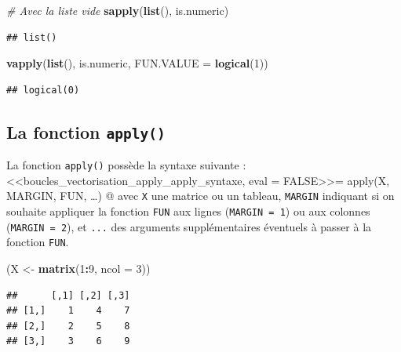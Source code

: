 \documentclass[
  11pt,
]{book}
\newenvironment{Shaded}{\begin{snugshade}}{\end{snugshade}}
\newcommand{\CommentTok}[1]{\textcolor[rgb]{0.56,0.35,0.01}{\textit{#1}}}
\newcommand{\DataTypeTok}[1]{\textcolor[rgb]{0.13,0.29,0.53}{#1}}
\newcommand{\DecValTok}[1]{\textcolor[rgb]{0.00,0.00,0.81}{#1}}
\newcommand{\KeywordTok}[1]{\textcolor[rgb]{0.13,0.29,0.53}{\textbf{#1}}}
\newcommand{\NormalTok}[1]{#1}
\newcommand{\OperatorTok}[1]{\textcolor[rgb]{0.81,0.36,0.00}{\textbf{#1}}}
\newcommand{\StringTok}[1]{\textcolor[rgb]{0.31,0.60,0.02}{#1}}
\numberwithin{equation}{section}
\numberwithin{countremarque}{section}
\begin{document}
\begin{Shaded}
\begin{Highlighting}[]
\CommentTok{\# Avec la liste vide}
\KeywordTok{sapply}\NormalTok{(}\KeywordTok{list}\NormalTok{(), is.numeric)}
\end{Highlighting}
\end{Shaded}

\begin{lstlisting}
## list()
\end{lstlisting}

\begin{Shaded}
\begin{Highlighting}[]
\KeywordTok{vapply}\NormalTok{(}\KeywordTok{list}\NormalTok{(), is.numeric, }\DataTypeTok{FUN.VALUE =} \KeywordTok{logical}\NormalTok{(}\DecValTok{1}\NormalTok{))}
\end{Highlighting}
\end{Shaded}

\begin{lstlisting}
## logical(0)
\end{lstlisting}

\hypertarget{boucles_vectorisation_apply_apply}{%
\subsection{\texorpdfstring{La fonction \texttt{apply()}}{La fonction apply()}}\label{boucles_vectorisation_apply_apply}}

La fonction \texttt{apply()} possède la syntaxe suivante :
\textless\textless boucles\_vectorisation\_apply\_apply\_syntaxe, eval = FALSE\textgreater\textgreater=
apply(X, MARGIN, FUN, \ldots)
@
avec \texttt{X} une matrice ou un tableau, \texttt{MARGIN} indiquant si on souhaite appliquer la fonction \texttt{FUN} aux lignes (\texttt{MARGIN\ =\ 1}) ou aux colonnes (\texttt{MARGIN\ =\ 2}), et \texttt{...} des arguments supplémentaires éventuels à passer à la fonction \texttt{FUN}.

\begin{Shaded}
\begin{Highlighting}[]
\NormalTok{(X \textless{}{-}}\StringTok{ }\KeywordTok{matrix}\NormalTok{(}\DecValTok{1}\OperatorTok{:}\DecValTok{9}\NormalTok{, }\DataTypeTok{ncol =} \DecValTok{3}\NormalTok{))}
\end{Highlighting}
\end{Shaded}

\begin{lstlisting}
##      [,1] [,2] [,3]
## [1,]    1    4    7
## [2,]    2    5    8
## [3,]    3    6    9
\end{lstlisting}
\end{document}
